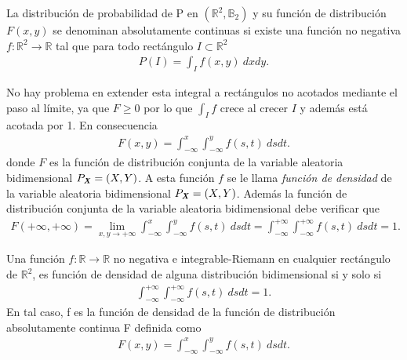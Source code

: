 \begin{defi}
    La distribución de probabilidad de P en $(\mathbb{R}^2, \mathbb{B}_2)$ y su función de distribución $F(x,y)$ se denominan absolutamente continuas si existe una función no negativa $f: \mathbb{R}^2 \longrightarrow \mathbb{R}$ tal que para todo rectángulo $I \subset \mathbb{R}^2$
    \begin{align*}
        P(I) = \int_{I}{f(x,y) \ dxdy}.
    \end{align*}
\end{defi}
No hay problema en extender esta integral a rectángulos no acotados mediante el paso al límite, ya que $F \ge 0$ por lo que $\int_{I}{f}$ crece al crecer $I$ y además está acotada por 1. En consecuencia
\begin{align*}
    F(x,y) = \int_{-\infty}^{x}{\int_{-\infty}^{y}{f(s,t) \ dsdt}}.
\end{align*}
donde $F$ es la función de distribución conjunta de la variable aleatoria bidimensional $P_{\textbf{\textit{X}}} = (X,Y)$. A esta función $f$ se le llama \textit{función de densidad} de la variable aleatoria bidimensional $P_{\textbf{\textit{X}}} = (X,Y)$.
Además la función de distribución conjunta de la variable aleatoria bidimensional debe verificar que
\begin{align*}
    F(+\infty, +\infty) = \lim_{x,y \to +\infty}\int_{-\infty}^{x}{\int_{-\infty}^{y}{f(s,t) \ dsdt}} = {\int_{-\infty}^{+\infty}{\int_{-\infty}^{+\infty}{f(s,t) \ dsdt}}} = 1.
\end{align*}

\begin{prop}
    Una función $f: \mathbb{R} \longrightarrow \mathbb{R}$ no negativa e integrable-Riemann en cualquier rectángulo de $\mathbb{R}^2$, es función de densidad de alguna distribución bidimensional si y solo si
    \begin{align*}
        {\int_{-\infty}^{+\infty}{\int_{-\infty}^{+\infty}{f(s,t) \ dsdt}}} = 1.
    \end{align*}
    En tal caso, f es la función de densidad de la función de distribución absolutamente continua F definida como
    \begin{align*}
        F(x,y) = \int_{-\infty}^{x}{\int_{-\infty}^{y}{f(s,t) \ dsdt}}.
    \end{align*}
\end{prop}

